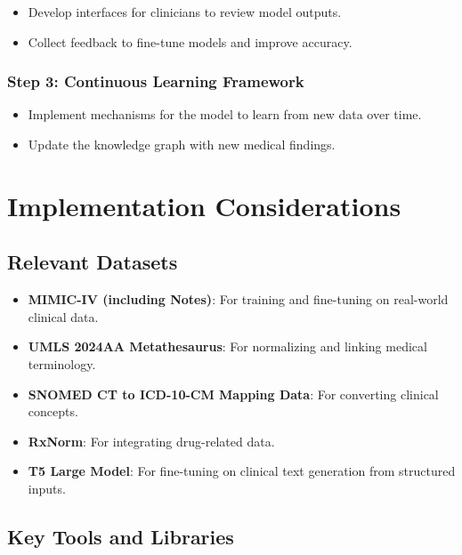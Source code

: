 \documentclass[12pt, a4paper]{article}
\begin{document}
\begin{itemize}
    \item Develop interfaces for clinicians to review model outputs.
    \item Collect feedback to fine-tune models and improve accuracy.
\end{itemize}

\subsubsection{Step 3: Continuous Learning Framework}

\begin{itemize}
    \item Implement mechanisms for the model to learn from new data over time.
    \item Update the knowledge graph with new medical findings.
\end{itemize}

\section{Implementation Considerations}

\subsection{Relevant Datasets}

\begin{itemize}
    \item \textbf{MIMIC-IV (including Notes)}: For training and fine-tuning on real-world clinical data.
    \item \textbf{UMLS 2024AA Metathesaurus}: For normalizing and linking medical terminology.
    \item \textbf{SNOMED CT to ICD-10-CM Mapping Data}: For converting clinical concepts.
    \item \textbf{RxNorm}: For integrating drug-related data.
    \item \textbf{T5 Large Model}: For fine-tuning on clinical text generation from structured inputs.
\end{itemize}

\subsection{Key Tools and Libraries}
\end{document}
